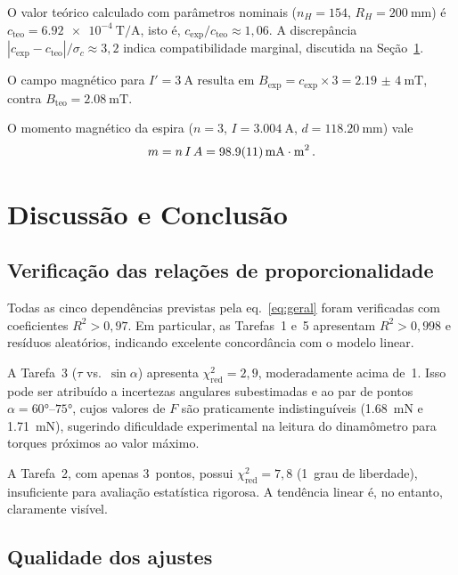 \documentclass[aps, twocolumn, superscriptaddress, floatfix, nofootinbib]{revtex4-2}
\begin{document}
O valor teórico calculado com parâmetros nominais ($n_H=154$,
$R_H=\SI{200}{\milli\metre}$) é $c_\text{teo}=\SI{6,92e-4}{\tesla\per\ampere}$,
isto é, $c_\text{exp}/c_\text{teo}\approx 1{,}06$. A discrepância
$|c_\text{exp}-c_\text{teo}|/\sigma_c\approx 3{,}2$ indica compatibilidade
marginal, discutida na Seção~\ref{sec:discussao}.

O campo magnético para $I'=\SI{3}{\ampere}$ resulta em
$B_\text{exp}=c_\text{exp}\times 3 = \SI{2,19(4)}{\milli\tesla}$, contra
$B_\text{teo}=\SI{2,08}{\milli\tesla}$.

O momento magnético da espira ($n=3$, $I=\SI{3,004}{\ampere}$,
$d=\SI{118,20}{\milli\metre}$) vale
\begin{equation}
  m = n\,I\,A = \SI{98,9(1,1)}{\milli\ampere\cdot\metre\squared}\,.
\end{equation}


\section{Discussão e Conclusão}\label{sec:discussao}

\subsection{Verificação das relações de proporcionalidade}

Todas as cinco dependências previstas pela eq.~\eqref{eq:geral} foram
verificadas com coeficientes $R^2>0{,}97$. Em particular, as Tarefas~1 e~5
apresentam $R^2>0{,}998$ e resíduos aleatórios, indicando excelente
concordância com o modelo linear.

A Tarefa~3 ($\tau$ vs.\ $\sin\alpha$) apresenta $\chi^2_{\text{red}}=2{,}9$,
moderadamente acima de~1. Isso pode ser atribuído a incertezas angulares
subestimadas e ao par de pontos $\alpha=\ang{60}$--$\ang{75}$, cujos valores
de $F$ são praticamente indistinguíveis (\SI{1,68}{\milli\newton} e
\SI{1,71}{\milli\newton}), sugerindo dificuldade experimental na leitura do
dinamômetro para torques próximos ao valor máximo.

A Tarefa~2, com apenas 3~pontos, possui $\chi^2_{\text{red}}=7{,}8$ (1~grau de
liberdade), insuficiente para avaliação estatística rigorosa. A tendência
linear é, no entanto, claramente visível.

\subsection{Qualidade dos ajustes}
\end{document}

